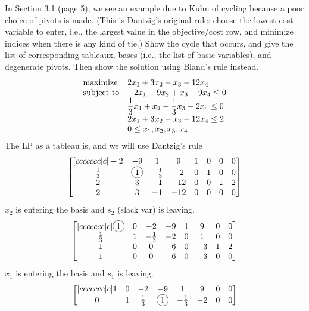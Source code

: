 \documentclass[12pt]{article}
\newcommand*\circled[1]{\tikz[baseline=(char.base)]{
		\node[shape=circle,draw,inner sep=2pt] (char) {#1};}}
\newenvironment{exercise}[2][Exercise]{\begin{trivlist}
		\item[\hskip \labelsep {\bfseries #1}\hskip \labelsep {\bfseries #2.}]}{\end{trivlist}}
\begin{document}
\begin{exercise}{4} In Section 3.1 (page 5), we see an example due to Kuhn of cycling because a poor choice of pivots is made.  (This is Dantzig's original rule: choose the lowest-cost variable to enter, i.e., the largest value in the objective/cost row, and minimize indices when there is any kind of tie.)  Show the cycle that occurs, and give the list of corresponding tableaux, bases (i.e., the list of basic variables), and degenerate pivots.  Then show the solution using Bland's rule instead.
\begin{equation*}
\begin{array}{ll@{}ll}
\text{maximize}  & \displaystyle 2x_1+3x_2-x_3-12x_4 &\\
\text{subject to}& \displaystyle -2x_1-9x_2+x_3+9x_4 \leq 0   \\
                 & \displaystyle \frac{1}{3}x_1+x_2-\frac{1}{3}x_3-2x_4 \leq 0 \\
                 & \displaystyle 2x_1+3x_2-x_3-12x_4 \leq 2 \\
                 & \displaystyle 0 \leq x_1,x_2,x_3,x_4
\end{array}
\end{equation*}
The LP as a tableau is, and we will use Dantzig's rule
\[\begin{bmatrix}[ccccccc|c]
	    -2      & -9 &     1        &   9 & 1 & 0 &  0 & 0\\
	\frac{1}{3} &  \circled{1} & -\frac{1}{3} &  -2 & 0 & 1 &  0 & 0\\
	     2      &  3 &    -1        & -12 & 0 & 0 &  1 & 2\\
	     2      &  3 &    -1        & -12 & 0 & 0 &  0 & 0
\end{bmatrix}\]
$x_2$ is entering the basis and $s_2$ (slack var) is leaving.
\[\begin{bmatrix}[ccccccc|c]
	\circled{1} &  0 &     -2       &  -9 & 1 &  9 &  0 & 0\\
	\frac{1}{3} &  1 & -\frac{1}{3} &  -2 & 0 &  1 &  0 & 0\\
	 	 1      &  0 &     0        &  -6 & 0 & -3 &  1 & 2\\
		 1      &  0 &     0        &  -6 & 0 & -3 &  0 & 0
\end{bmatrix}\]
$x_1$ is entering the basis and $s_1$ is leaving.
\[\begin{bmatrix}[ccccccc|c]
		 1 &  0 &     -2       &  -9 &  1            &   9 &  0 & 0\\
		 0 &  1 & \frac{1}{3}  &   \circled{1} &  -\frac{1}{3} &  -2 &  0 & 0\\

\end{bmatrix}\]
\end{exercise}
\end{document}
